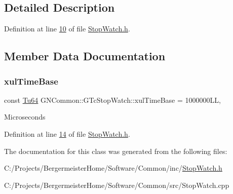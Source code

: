 \subsection{Detailed Description}


Definition at line \mbox{\hyperlink{_stop_watch_8h_source_l00010}{10}} of file \mbox{\hyperlink{_stop_watch_8h_source}{Stop\+Watch.\+h}}.



\subsection{Member Data Documentation}
\mbox{\label{class_g_n_common_1_1_g_tc_stop_watch_a525b6eebced7d4d9c3812788cfde2b75}} 
\subsubsection{\texorpdfstring{xul\+Time\+Base}{xulTimeBase}}
{\footnotesize\ttfamily const \mbox{\hyperlink{namespace_g_n_common_a9404ee6090c788ae70aebd1436ceb97d}{Tu64}} G\+N\+Common\+::\+G\+Tc\+Stop\+Watch\+::xul\+Time\+Base = 1000000\+LL\hspace{0.3cm}{\ttfamily [static]}, {\ttfamily [protected]}}

Microseconds 

Definition at line \mbox{\hyperlink{_stop_watch_8h_source_l00014}{14}} of file \mbox{\hyperlink{_stop_watch_8h_source}{Stop\+Watch.\+h}}.



The documentation for this class was generated from the following files\+:\begin{DoxyCompactItemize}
\item 
C\+:/\+Projects/\+Bergermeister\+Home/\+Software/\+Common/inc/\mbox{\hyperlink{_stop_watch_8h}{Stop\+Watch.\+h}}\item 
C\+:/\+Projects/\+Bergermeister\+Home/\+Software/\+Common/src/Stop\+Watch.\+cpp\end{DoxyCompactItemize}

